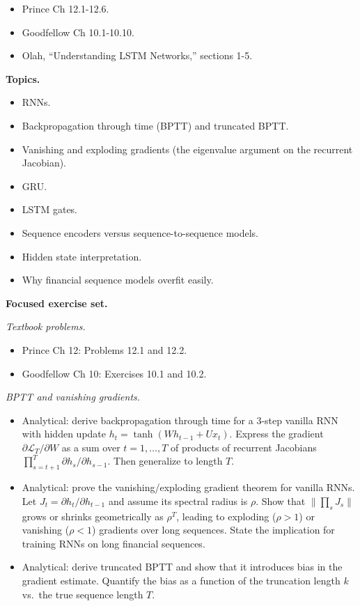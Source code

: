 \begin{itemize}
\tightlist
\item
  Prince Ch 12.1-12.6.
\item
  Goodfellow Ch 10.1-10.10.
\item
  Olah, ``Understanding LSTM Networks,'' sections 1-5.
\end{itemize}

\textbf{Topics.}

\begin{itemize}
\tightlist
\item
  RNNs.
\item
  Backpropagation through time (BPTT) and truncated BPTT.
\item
  Vanishing and exploding gradients (the eigenvalue argument on the
  recurrent Jacobian).
\item
  GRU.
\item
  LSTM gates.
\item
  Sequence encoders versus sequence-to-sequence models.
\item
  Hidden state interpretation.
\item
  Why financial sequence models overfit easily.
\end{itemize}

\textbf{Focused exercise set.}

\emph{Textbook problems.}

\begin{itemize}
\tightlist
\item
  Prince Ch 12: Problems 12.1 and 12.2.
\item
  Goodfellow Ch 10: Exercises 10.1 and 10.2.
\end{itemize}

\emph{BPTT and vanishing gradients.}

\begin{itemize}
\tightlist
\item
  Analytical: derive backpropagation through time for a 3-step vanilla
  RNN with hidden update \(h_t = \tanh(W h_{t-1} + U x_t)\). Express the
  gradient \(\partial \mathcal{L}_T / \partial W\) as a sum over
  \(t = 1, \ldots, T\) of products of recurrent Jacobians
  \(\prod_{s=t+1}^{T} \partial h_s / \partial h_{s-1}\). Then generalize
  to length \(T\).
\item
  Analytical: prove the vanishing/exploding gradient theorem for vanilla
  RNNs. Let \(J_t = \partial h_t / \partial h_{t-1}\) and assume its
  spectral radius is \(\rho\). Show that \(\|\prod_{s} J_s\|\) grows or
  shrinks geometrically as \(\rho^T\), leading to exploding
  (\(\rho > 1\)) or vanishing (\(\rho < 1\)) gradients over long
  sequences. State the implication for training RNNs on long financial
  sequences.
\item
  Analytical: derive truncated BPTT and show that it introduces bias in
  the gradient estimate. Quantify the bias as a function of the
  truncation length \(k\) vs.~the true sequence length \(T\).
\end{itemize}

